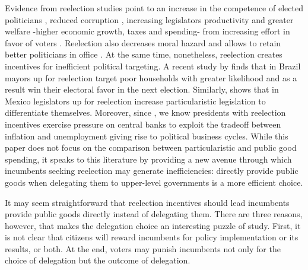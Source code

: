 \documentclass[12pt]{amsart}
\makeatletter
\def\subsection{\@startsection{subsection}{2}
	\z@{.8\linespacing\@plus.7\linespacing}{.7\linespacing}{\large}}
\numberwithin{equation}{section}
\theoremstyle{definition}
\theoremstyle{definition}
\theoremstyle{definition}
\makeatother
\begin{document}
Evidence from reelection studies point to an increase in the competence of elected politicians \citep{dalbo_etal_2017}, reduced corruption \citep{ferraz_finan_2011}, increasing legislators productivity \citep{hall_etal_2018} and greater welfare -higher economic growth, taxes and spending- from increasing effort in favor of voters \citep{alt_etal_2011}. Reelection also decreases moral hazard and allows to retain better politicians in office \citep{smart_sturm_2013}. At the same time, nonetheless, reelection creates incentives for inefficient political targeting. A recent study by \citet{frey_2021} finds that in Brazil mayors up for reelection target poor households with greater likelihood and as a result win their electoral favor in the next election. Similarly, \citet{motolinia_2020} shows that in Mexico legislators up for reelection increase particularistic legislation to differentiate themselves. Moreover, since \citet{Nordhaus_1975}, we know presidents with reelection incentives exercise pressure on central banks to exploit the tradeoff between inflation and unemployment giving rise to political business cycles. While this paper does not focus on the comparison between particularistic and public good spending, it speaks to this literature by providing a new avenue through which incumbents seeking reelection may generate inefficiencies: directly provide public goods when delegating them to upper-level governments is a more efficient choice. 
  

\subsection{The puzzle \label{sec:puzzle}} 

It may seem straightforward that reelection incentives should lead incumbents provide public goods directly instead of delegating them. There are three reasons, however, that makes the delegation choice an interesting puzzle of study. First, it is not clear that citizens will reward incumbents for policy implementation or its results, or both. At the end, voters may punish incumbents not only for the choice of delegation but the outcome of delegation. 
\end{document}
